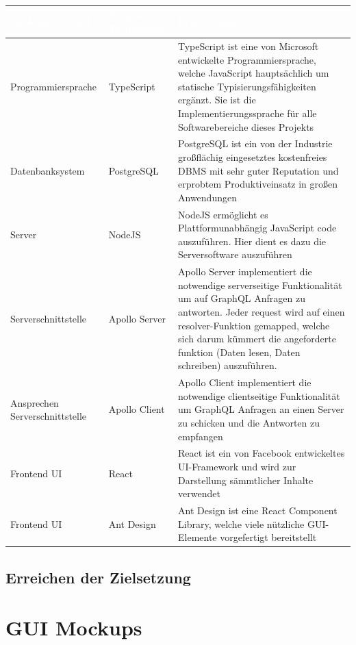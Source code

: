 \documentclass[a4paper,12pt]{article}
\begin{document}
\begin{center}
      \begin{tabular}{|m{3.5cm}|m{3cm}|m{9cm}|}
            \hline
        \rowcolor{TUMBlue} \textcolor{white}{\textbf{Funktion/Gebiet}} & \textcolor{white}{\textbf{Eingesetzte Technologie}} & \textcolor{white}{\textbf{Erläuterung}} \\
        \hline
        Programmiersprache & TypeScript & TypeScript ist eine von Microsoft entwickelte Programmiersprache, welche JavaScript hauptsächlich um statische Typisierungsfähigkeiten ergänzt. Sie ist die Implementierungssprache für alle Softwarebereiche dieses Projekts \\
        \hline
        Datenbanksystem & PostgreSQL & PostgreSQL ist ein von der Industrie großflächig eingesetztes kostenfreies DBMS mit sehr guter Reputation und erprobtem Produktiveinsatz in großen Anwendungen \\
        \hline
        Server & NodeJS & NodeJS ermöglicht es Plattformunabhängig JavaScript code auszuführen. Hier dient es dazu die Serversoftware auszuführen \\
        \hline
        Serverschnittstelle & Apollo Server & Apollo Server implementiert die notwendige serverseitige Funktionalität um auf GraphQL Anfragen zu antworten. Jeder request wird auf einen resolver-Funktion gemapped, welche sich darum kümmert die angeforderte funktion (Daten lesen, Daten schreiben) auszuführen. \\
        \hline
        Ansprechen Serverschnittstelle & Apollo Client & Apollo Client implementiert die notwendige clientseitige Funktionalität um GraphQL Anfragen an einen Server zu schicken und die Antworten zu empfangen \\
        \hline
        Frontend UI & React & React ist ein von Facebook entwickeltes UI-Framework und wird zur Darstellung sämmtlicher Inhalte verwendet \\
        \hline
        Frontend UI & Ant Design & Ant Design ist eine React Component Library, welche viele nützliche GUI-Elemente vorgefertigt bereitstellt \\
        \hline
      \end{tabular}
\end{center}

\subsection{Erreichen der Zielsetzung}


\section{GUI Mockups}
\end{document}
